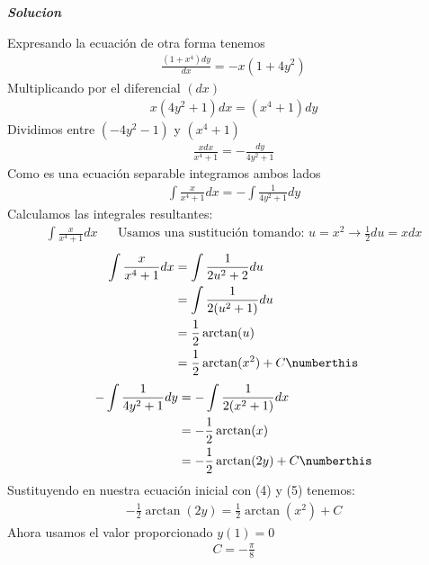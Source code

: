 \begin{enumerate}
\begin{enumerate}
\textit{ \textbf{Solucion}}
    
    Expresando la ecuación de otra forma tenemos
    \begin{align*}
        \frac{(1+x^{4})dy}{dx}=-x(1+4y^{2})
    \end{align*}
    Multiplicando por el diferencial $(dx)$
    \begin{align*}
        x(4y^{2}+1)dx = (x^{4}+1)dy
    \end{align*}
    Dividimos entre $(-4y^{2}-1)$ y $(x^{4}+1)$
    \begin{align*}
        \frac{xdx}{x^{4}+1}=-\frac{dy}{4y^{2}+1}
    \end{align*}
    Como es una ecuación separable integramos ambos lados
    \begin{align*}
        \int \frac{x}{x^{4}+1}dx = -\int \frac{1}{4y^{2}+1}dy 
    \end{align*}
    Calculamos las integrales resultantes:
    \begin{align*}
        \int \frac{x}{x^{4}+1}dx
        & & \text{Usamos una sustitución tomando: } u=x^{2}\rightarrow \frac{1}{2}du =xdx
    \end{align*}
    \begin{align*}
        \int \frac{x}{x^{4}+1} dx & = \int \frac{1}{2u^{2}+2} du\\
        & = \int \frac{1}{2(u^{2}+1)}du\\
        & = \frac{1}{2}\arctan (u)\\
        & = \frac{1}{2}\arctan (x^{2}) + C \numberthis
    \end{align*}
    \begin{align*}
        - \int \frac{1}{4y^{2}+1}dy & = - \int \frac{1}{2(x^{2}+1)}dx\\
        & = -\frac{1}{2}\arctan (x)\\
        & = -\frac{1}{2}\arctan (2y) + C \numberthis
    \end{align*}
    Sustituyendo en nuestra ecuación inicial con (4) y (5) tenemos:
\begin{align*}
    - \frac{1}{2}\arctan (2y)= \frac{1}{2}\arctan (x^{2})+C
\end{align*}
Ahora usamos el valor proporcionado $y(1)=0$
\begin{align*}
    C= - \frac{\pi}{8}
\end{align*}
\end{enumerate}
\end{enumerate}
